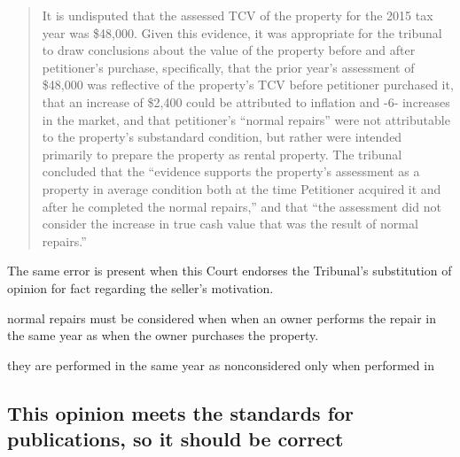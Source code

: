 \documentclass[12pt,\documentclassflag]{michiganCourtOfAppealsBrief}
\begin{document}
\begin{quotation}
   It is undisputed that the assessed
TCV of the property for the 2015 tax year was \$48,000. Given this evidence, it was appropriate
for the tribunal to draw conclusions about the value of the property before and after petitioner's
purchase, specifically, that the prior year's assessment of \$48,000 was reflective of the property's
TCV before petitioner purchased it, that an increase of \$2,400 could be attributed to inflation and 
-6-
increases in the market, and that petitioner's “normal repairs” were not attributable to the
property's substandard condition, but rather were intended primarily to prepare the property as
rental property. The tribunal concluded that the “evidence supports the property's assessment as
a property in average condition both at the time Petitioner acquired it and after he completed the
normal repairs,” and that “the assessment did not consider the increase in true cash value that was
the result of normal repairs.”
\end{quotation}

The same error is present when this Court endorses the Tribunal's substitution of opinion for fact regarding the seller's motivation.


normal repairs must be considered when when an owner performs the repair in the same year as when the owner purchases the property.

they are performed in the same year as  nonconsidered only when performed in

\subsection{This opinion meets the standards for publications, so it should be correct}
\end{document}
